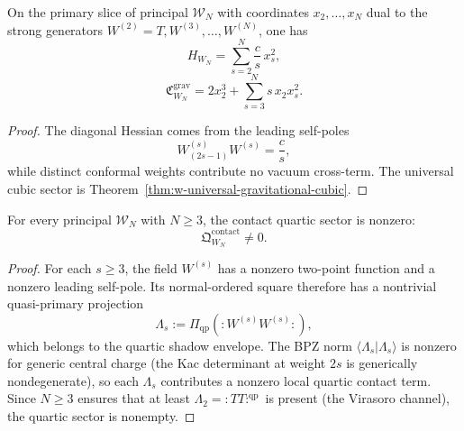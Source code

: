 \begin{theorem}
\label{thm:w-principal-wn-hessian-cubic}
On the primary slice of principal $\mathcal{W}_N$ with coordinates
$x_2,\dots,x_N$ dual to the strong generators
$W^{(2)}=T,W^{(3)},\dots,W^{(N)}$, one has
\begin{equation}
\label{eq:w-principal-wn-hessian}
H_{W_N}=\sum_{s=2}^N\frac{c}{s}\,x_s^2,
\end{equation}
\begin{equation}
\label{eq:w-principal-wn-cubic}
\mathfrak C^{\mathrm{grav}}_{W_N}=2x_2^3+\sum_{s=3}^N s\,x_2x_s^2.
\end{equation}
\end{theorem}

\begin{proof}
The diagonal Hessian comes from the leading self-poles
\[
W^{(s)}_{(2s-1)}W^{(s)}=\frac cs,
\]
while distinct conformal weights contribute no vacuum cross-term.
The universal cubic sector is
Theorem~\ref{thm:w-universal-gravitational-cubic}.\qedhere
\end{proof}

\begin{theorem}
\label{thm:w-principal-wn-contact-nonvanishing}
For every principal $\mathcal{W}_N$ with $N\ge 3$, the contact quartic
sector is nonzero:
\begin{equation}
\label{eq:w-principal-wn-contact-nonvanishing}
\mathfrak Q_{W_N}^{\mathrm{contact}}\neq 0.
\end{equation}
\end{theorem}

\begin{proof}
For each $s\ge 3$, the field $W^{(s)}$ has a nonzero two-point function
and a nonzero leading self-pole.  Its normal-ordered square therefore
has a nontrivial quasi-primary projection
\[
\Lambda_s:=\Pi_{\mathrm{qp}}({:}W^{(s)}W^{(s)}{:}),
\]
which belongs to the quartic shadow envelope.  The BPZ norm
$\langle\Lambda_s|\Lambda_s\rangle$ is nonzero for generic central
charge (the Kac determinant at weight $2s$ is generically nondegenerate),
so each $\Lambda_s$ contributes a nonzero local quartic contact term.
Since $N\ge 3$ ensures that at least $\Lambda_2={:}TT{:}^{\mathrm{qp}}$
is present (the Virasoro channel), the quartic sector is nonempty.\qedhere
\end{proof}

